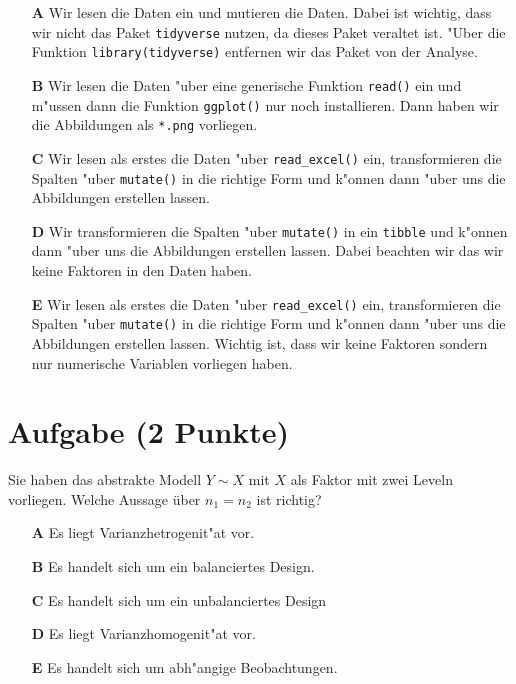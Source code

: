 \documentclass[a4paper, 9pt]{scrartcl}\usepackage[]{graphicx}\usepackage[]{xcolor}
\begin{document}
\begin{enumerate}
\item [\textbf{A} \msquare] Wir lesen die Daten ein und mutieren die Daten. Dabei ist wichtig, dass wir nicht das Paket \texttt{tidyverse} nutzen, da dieses Paket veraltet ist. {"U}ber die Funktion \texttt{library(tidyverse)} entfernen wir das Paket von der Analyse.
\item [\textbf{B} \msquare] Wir lesen die Daten {"u}ber eine generische Funktion \texttt{read()} ein und m{"u}ssen dann die Funktion \texttt{ggplot()} nur noch installieren. Dann haben wir die Abbildungen als \texttt{*.png} vorliegen.
\item [\textbf{C} \msquare] Wir lesen als erstes die Daten {"u}ber \texttt{read\_excel()} ein, transformieren die Spalten {"u}ber \texttt{mutate()} in die richtige Form und k{"o}nnen dann {"u}ber  uns die Abbildungen erstellen lassen.
\item [\textbf{D} \msquare] Wir transformieren die Spalten {"u}ber \texttt{mutate()} in ein \texttt{tibble} und k{"o}nnen dann {"u}ber  uns die Abbildungen erstellen lassen. Dabei beachten wir das wir keine Faktoren in den Daten haben.
\item [\textbf{E} \msquare] Wir lesen als erstes die Daten {"u}ber \texttt{read\_excel()} ein, transformieren die Spalten {"u}ber \texttt{mutate()} in die richtige Form und k{"o}nnen dann  {"u}ber  uns die Abbildungen erstellen lassen. Wichtig ist, dass wir keine Faktoren sondern nur numerische Variablen vorliegen haben.
\end{enumerate}

\section{Aufgabe \hfill (2 Punkte)}




Sie haben das abstrakte Modell $Y \sim X$ mit $X$ als Faktor mit zwei
Leveln vorliegen. Welche Aussage {\"u}ber $n_1 = n_2$ ist richtig?



\begin{enumerate}
\item [\textbf{A} \msquare] Es liegt Varianzhetrogenit{"a}t vor.
\item [\textbf{B} \msquare] Es handelt sich um ein balanciertes Design.
\item [\textbf{C} \msquare] Es handelt sich um ein unbalanciertes Design
\item [\textbf{D} \msquare] Es liegt Varianzhomogenit{"a}t vor.
\item [\textbf{E} \msquare] Es handelt sich um abh{"a}ngige Beobachtungen.
\end{enumerate}
\end{document}
